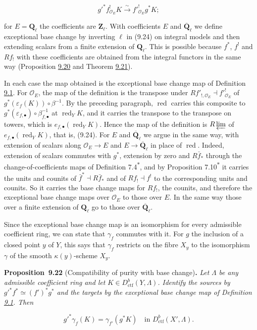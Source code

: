 \documentclass[11pt]{article}
\newenvironment{bpstatement}[2]{\par\addvspace{0.6\baselineskip}\noindent\textbf{#1}#2\textbf{.}\enspace\ignorespaces}
  {\par\addvspace{0.4\baselineskip}}
\newenvironment{bpstatementit}[2]{\begin{bpstatement}{#1}{#2}\itshape\ignorespaces}{\end{bpstatement}}
\newcommand{\bpout}[1]{#1\textsuperscript{\hyperlink{bp-outside}{\ensuremath{\ast}}}}
\begin{document}
\[
g'^{*}f_{\mathcal O_E}^{!}K
\xrightarrow{\sim}f'^{!}_{\mathcal O_E}g^{*}K;
\tag{9.24}
\]

for \(E=\mathbf Q_\ell\) the coefficients are \(\mathbf Z_\ell\). With coefficients \(E\) and \(\overline{\mathbf Q}_\ell\) we define exceptional base change by inverting \(\ell\) in (9.24) on integral models and then extending scalars from a finite extension of \(\mathbf Q_\ell\). This is possible because \(f^*\), \(f^!\) and \(Rf_!\) with these coefficients are obtained from the integral functors in the same way (Proposition \hyperref[bp66]{9.20} and Theorem \hyperref[bp69]{9.21}).

In each case the map obtained is the exceptional base change map of Definition \hyperref[bp5]{9.1}. For \(\mathcal O_E\), the map of the definition is the transpose under \(Rf'_{!,\mathcal O_E}\dashv f'^!_{\mathcal O_E}\) of \(g^*(\varepsilon_f(K))\circ\beta^{-1}\). By the preceding paragraph, \(\operatorname{red}\) carries this composite to \(g^*(\varepsilon_{f,\bullet})\circ\beta_{f,\bullet}^{-1}\) at \(\operatorname{red}_YK\), and it carries the transpose to the transpose on towers, which is \(e_{f,\bullet}(\operatorname{red}_YK)\). Hence the map of the definition is \(R\varprojlim\) of \(e_{f,\bullet}(\operatorname{red}_YK)\), that is, (9.24). For \(E\) and \(\overline{\mathbf Q}_\ell\) we argue in the same way, with extension of scalars along \(\mathcal O_E\to E\) and \(E\to\overline{\mathbf Q}_\ell\) in place of \(\operatorname{red}\). Indeed, extension of scalars commutes with \(g^*\), extension by zero and \(R\bar f_*\) through the change-of-coefficients maps of Definition \bpout{7.4}, and by Proposition \bpout{7.10} it carries the units and counits of \(\bar f^*\dashv R\bar f_*\) and of \(Rf_!\dashv f^!\) to the corresponding units and counits. So it carries the base change maps for \(Rf_!\), the counits, and therefore the exceptional base change maps over \(\mathcal O_E\) to those over \(E\). In the same way those over a finite extension of \(\mathbf Q_\ell\) go to those over \(\overline{\mathbf Q}_\ell\).

Since the exceptional base change map is an isomorphism for every admissible coefficient ring, we can state that \(\gamma_f\) commutes with it. For \(g\) the inclusion of a closed point \(y\) of \(Y\), this says that \(\gamma_f\) restricts on the fibre \(X_y\) to the isomorphism \(\gamma\) of the smooth \(\kappa(y)\)-scheme \(X_y\).

\label{bp76}%
\begin{bpstatementit}{Proposition~9.22}{ (Compatibility of purity with base change)}
Let \(\Lambda\) be any admissible coefficient ring and let \(K\in D^b_{\mathrm{ctf}}(Y,\Lambda)\). Identify the sources by \(g'^{*}f^{*}\simeq(f')^{*}g^{*}\) and the targets by the exceptional base change map of Definition \hyperref[bp5]{9.1}. Then

\[
g'^{*}\gamma_f(K)
=\gamma_{f'}(g^{*}K)
\quad\text{in }D^b_{\mathrm{ctf}}(X',\Lambda).
\]
\end{bpstatementit}
\end{document}
